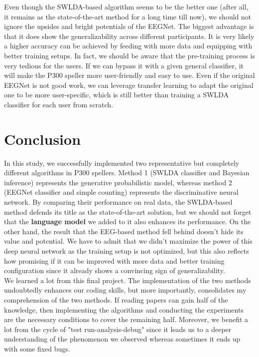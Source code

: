 \documentclass{article}
\begin{document}
\vspace{-3mm}
Even though the SWLDA-based algorithm seems to be the better one (after all, it remains as the state-of-the-art method for a long time till now), we should not ignore the upsides and bright potentials of the EEGNet. The biggest advantage is that it does show the generalizability across different participants. It is very likely a higher accuracy can be achieved by feeding with more data and equipping with better training setups. In fact, we should be aware that the pre-training process is very tedious for the users. If we can bypass it with a given general classifier, it will make the P300 speller more user-friendly and easy to use. Even if the original EEGNet is not good work, we can leverage transfer learning to adapt the original one to be more user-specific, which is still better than training a SWLDA classifier for each user from scratch.

\vspace{-5mm}
\section{Conclusion} \label{Conclusion}
\vspace{-3mm}
In this study, we successfully implemented two representative but completely different algorithms in P300 spellers. Method 1 (SWLDA classifier and Bayesian inference) represents the generative probabilistic model, whereas method 2 (EEGNet classifier and simple counting) represents the discriminative neural network. By comparing their performance on real data, the SWLDA-based method defends its title as the state-of-the-art solution, but we should not forget that the \textbf{language model} we added to it also enhances its performance. On the other hand, the result that the EEG-based method fell behind doesn't hide its value and potential. We have to admit that we didn't maximize the power of this deep neural network as the training setup is not optimized, but this also reflects how promising if it can be improved with more data and better training configuration since it already shows a convincing sign of generalizability.\\

\vspace{-3mm}
We learned a lot from this final project. The implementation of the two methods undoubtedly enhances our coding skills, but more importantly, consolidates my comprehension of the two methods. If reading papers can gain half of the knowledge, then implementing the algorithms and conducting the experiments are the necessary conditions to cover the remaining half. Moreover, we benefit a lot from the cycle of "test run-analysis-debug" since it leads us to a deeper understanding of the phenomenon we observed whereas sometimes it ends up with some fixed bugs.\\
\end{document}
